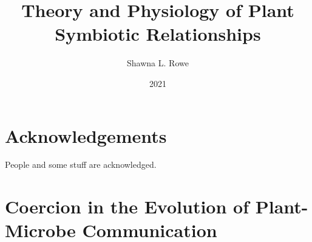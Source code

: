\documentclass[PhD]{msu-thesis}
\title{Theory and Physiology of Plant Symbiotic Relationships}
\author{Shawna L. Rowe}
\date{2021}
\begin{document}
\frontmatter
\maketitlepage


\begin{abstract}
\end{abstract}

\clearpage

\makecopyrightpage

%
%
\clearpage
\chapter*{Acknowledgements}
\DoubleSpacing %
People and some stuff are acknowledged.
%
\clearpage
\SingleSpacing
\tableofcontents* %
\clearpage
\listoftables %
\clearpage
\listoffigures %
%
%
\mainmatter
%

\chapter{Coercion in the Evolution of Plant-Microbe Communication}
%
%
%
\end{document}
